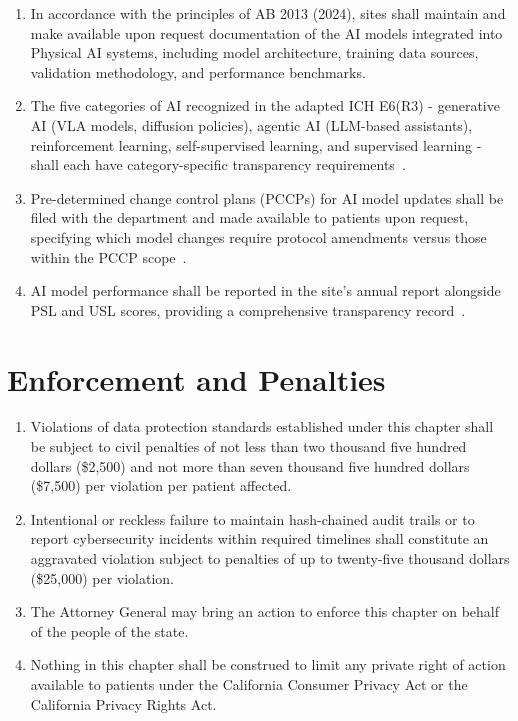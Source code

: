 \documentclass[11pt,letterpaper]{article}
\begin{document}
\begin{enumerate}[label=(\alph*)]
\item In accordance with the principles of AB 2013 (2024), sites shall maintain
  and make available upon request documentation of the AI models integrated
  into Physical AI systems, including model architecture, training data
  sources, validation methodology, and performance benchmarks.

\item The five categories of AI recognized in the adapted ICH E6(R3) -
  generative AI (VLA models, diffusion policies), agentic AI (LLM-based
  assistants), reinforcement learning, self-supervised learning, and
  supervised learning - shall each have category-specific transparency
  requirements~\cite{iche6r3adapt}.

\item Pre-determined change control plans (PCCPs) for AI model updates shall be
  filed with the department and made available to patients upon request,
  specifying which model changes require protocol amendments versus those
  within the PCCP scope~\cite{cfr312adapt}.

\item AI model performance shall be reported in the site's annual report
  alongside PSL and USL scores, providing a comprehensive transparency
  record~\cite{cfr312adapt}.
\end{enumerate}

\section{Enforcement and Penalties}

\begin{enumerate}[label=(\alph*)]
\item Violations of data protection standards established under this chapter
  shall be subject to civil penalties of not less than two thousand five
  hundred dollars (\$2,500) and not more than seven thousand five hundred
  dollars (\$7,500) per violation per patient affected.

\item Intentional or reckless failure to maintain hash-chained audit trails or
  to report cybersecurity incidents within required timelines shall constitute
  an aggravated violation subject to penalties of up to twenty-five thousand
  dollars (\$25,000) per violation.

\item The Attorney General may bring an action to enforce this chapter on behalf
  of the people of the state.

\item Nothing in this chapter shall be construed to limit any private right of
  action available to patients under the California Consumer Privacy Act or
  the California Privacy Rights Act.
\end{enumerate}
\end{document}
